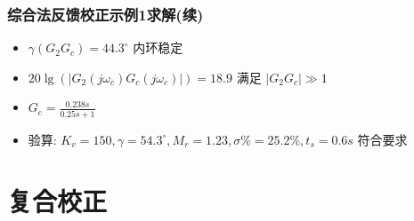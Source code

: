 \documentclass[table]{beamer}
\begin{document}
\begin{frame}
\frametitle{综合法反馈校正示例1求解(续)}
\label{sec-6-3-8}

\begin{itemize}
\item $\gamma(G_2G_c)=44.3^{\circ}$ 内环稳定
\item $20\lg(|G_2(j\omega_c)G_c(j\omega_c)|)=18.9$ 满足 $|G_2G_c|\gg 1$
\item $G_c=\frac{0.238s}{0.25s+1}$
\item 验算: $K_v=150,\gamma=54.3^{\circ},M_r=1.23,\sigma\%=25.2\%,t_s=0.6s$  符合要求
\end{itemize}
   
\end{frame}
\section{复合校正}
\label{sec-7}
\end{document}
